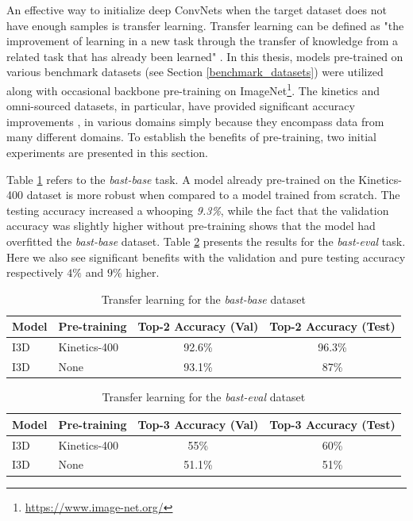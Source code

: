 \documentclass[extern,palatino]{cgMA}
\begin{document}
An effective way to initialize deep ConvNets when the target dataset does not have enough samples is transfer learning. Transfer learning can be defined as "the improvement of learning in a new task through the transfer of knowledge from a related task that has already been learned" \cite{torrey2010transfer}. In this thesis, models pre-trained on various benchmark datasets (see Section \ref{benchmark_datasets}) were utilized along with occasional backbone pre-training on ImageNet\footnote{\url{https://www.image-net.org/}}. The kinetics and omni-sourced datasets, in particular, have provided significant accuracy improvements \cite{carreira2017quo}, \cite{duan2020omni} in various domains simply because they encompass data from many different domains. To establish the benefits of pre-training, two initial experiments are presented in this section. 

\bigskip
\noindent Table \ref{tab:pre_training_influence_base} refers to the \textit{bast-base} task. A model already pre-trained on the Kinetics-400 dataset is more robust when compared to a model trained from scratch. The testing accuracy increased a whooping \textit{9.3\%}, while the fact that the validation accuracy was slightly higher without pre-training shows that the model had overfitted the \textit{bast-base} dataset. Table \ref{tab:pre_training_influence_eval} presents the results for the \textit{bast-eval} task. Here we also see significant benefits with the validation and pure testing accuracy respectively $4\%$ and $9\%$ higher.

\begin{table}[h!]
  \begin{center}
    \caption{Transfer learning for the \textit{bast-base} dataset}
    \label{tab:pre_training_influence_base}
    \begin{tabular}{l|l|c|c}
      \textbf{Model} & \textbf{Pre-training} & \textbf{Top-2 Accuracy (Val)} & \textbf{Top-2 Accuracy (Test) }\\
      \hline
      I3D & Kinetics-400 & 92.6\% & 96.3\% \\
      I3D & None & 93.1\% & 87\% \\
    \end{tabular}
  \end{center}
\end{table}

\begin{table}[h!]
  \begin{center}
    \caption{Transfer learning for the \textit{bast-eval} dataset}
    \label{tab:pre_training_influence_eval}
    \begin{tabular}{l|l|c|c}
      \textbf{Model} & \textbf{Pre-training} & \textbf{Top-3 Accuracy (Val)} & \textbf{Top-3 Accuracy (Test) }\\
      \hline
      I3D & Kinetics-400 & 55\% & 60\% \\
      I3D & None & 51.1\% & 51\% \\
    \end{tabular}
  \end{center}
\end{table}
\end{document}
